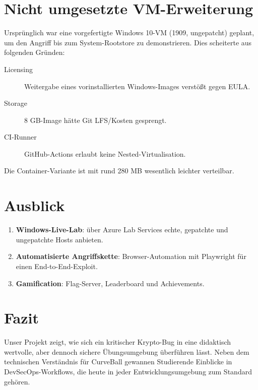 \documentclass{article}
\begin{document}
\section{Nicht umgesetzte VM-Erweiterung}
Ursprünglich war eine vorgefertigte Windows 10-VM (1909, ungepatcht) geplant,
um den Angriff bis zum System-Rootstore zu demonstrieren.
Dies scheiterte aus folgenden Gründen:
\begin{description}
  \item[Licensing] Weitergabe eines vorinstallierten Windows-Images verstößt gegen EULA.
  \item[Storage] 8 GB-Image hätte Git LFS/Kosten gesprengt.
  \item[CI-Runner] GitHub-Actions erlaubt keine Nested-Virtualisation.
\end{description}
Die Container-Variante ist mit rund 280 MB wesentlich leichter verteilbar.

\section{Ausblick}
\begin{enumerate}
  \item \textbf{Windows-Live-Lab}: über Azure Lab Services echte, gepatchte und ungepatchte Hosts anbieten.
  \item \textbf{Automatisierte Angriffskette}: Browser-Automation mit Playwright für einen End-to-End-Exploit.
  \item \textbf{Gamification}: Flag-Server, Leaderboard und Achievements.
\end{enumerate}

\section{Fazit}
Unser Projekt zeigt, wie sich ein kritischer Krypto-Bug in eine
didaktisch wertvolle, aber dennoch sichere Übungsumgebung überführen lässt.
Neben dem technischen Verständnis für CurveBall gewannen Studierende
Einblicke in DevSecOps-Workflows, die heute in jeder Entwicklungsumgebung
zum Standard gehören.
\end{document}
